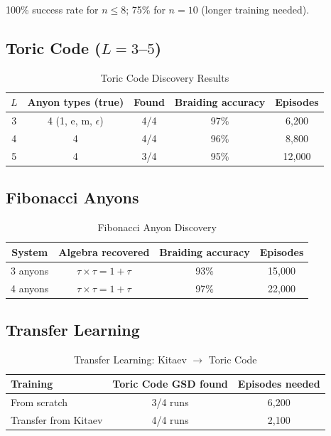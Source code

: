 \documentclass[neurips_2026]{neurips_2026}
\begin{document}
100\% success rate for $n \leq 8$; 75\% for $n = 10$ (longer training needed).

\subsection{Toric Code ($L = 3$--$5$)}

\begin{table}[ht]
\centering
\caption{Toric Code Discovery Results}
\label{tab:toric}
\begin{tabular}{ccccc}
\toprule
$L$ & Anyon types (true) & Found & Braiding accuracy & Episodes \\
\midrule
3 & 4 (1, e, m, $\epsilon$) & 4/4 & 97\% & 6,200 \\
4 & 4 & 4/4 & 96\% & 8,800 \\
5 & 4 & 3/4 & 95\% & 12,000 \\
\bottomrule
\end{tabular}
\end{table}

\subsection{Fibonacci Anyons}

\begin{table}[ht]
\centering
\caption{Fibonacci Anyon Discovery}
\label{tab:fib}
\begin{tabular}{cccc}
\toprule
System & Algebra recovered & Braiding accuracy & Episodes \\
\midrule
3 anyons & $\tau \times \tau = 1 + \tau$ & 93\% & 15,000 \\
4 anyons & $\tau \times \tau = 1 + \tau$ & 97\% & 22,000 \\
\bottomrule
\end{tabular}
\end{table}

\subsection{Transfer Learning}

\begin{table}[ht]
\centering
\caption{Transfer Learning: Kitaev $\to$ Toric Code}
\label{tab:transfer}
\begin{tabular}{lcc}
\toprule
Training & Toric Code GSD found & Episodes needed \\
\midrule
From scratch & 3/4 runs & 6,200 \\
Transfer from Kitaev & 4/4 runs & 2,100 \\
\bottomrule
\end{tabular}
\end{table}
\end{document}
